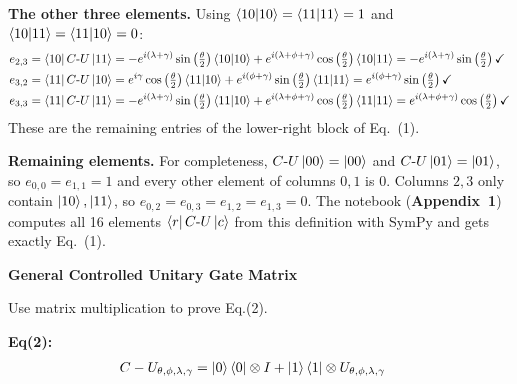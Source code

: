\documentclass[a4paper, 10pt]{article}
\begin{document}
\begin{solution}
	\noindent \textbf{The other three elements.} Using \( \braket{10 \vert 10} = \braket{11 \vert 11} = 1 \) and \( \braket{10 \vert 11} = \braket{11 \vert 10} = 0 \):
	\begin{align*}
		e_{2, 3} & = \bra{10} C\text{-}U \ket{11} = -e^{i\left(\lambda + \gamma\right)}\sin\left(\tfrac{\theta}{2}\right)\braket{10 \vert 10} + e^{i\left(\lambda + \phi + \gamma\right)}\cos\left(\tfrac{\theta}{2}\right)\braket{10 \vert 11} = -e^{i\left(\lambda + \gamma\right)}\sin\left(\tfrac{\theta}{2}\right) \checkmark \\
		e_{3, 2} & = \bra{11} C\text{-}U \ket{10} = e^{i\gamma}\cos\left(\tfrac{\theta}{2}\right)\braket{11 \vert 10} + e^{i\left(\phi + \gamma\right)}\sin\left(\tfrac{\theta}{2}\right)\braket{11 \vert 11} = e^{i\left(\phi + \gamma\right)}\sin\left(\tfrac{\theta}{2}\right) \checkmark \\
		e_{3, 3} & = \bra{11} C\text{-}U \ket{11} = -e^{i\left(\lambda + \gamma\right)}\sin\left(\tfrac{\theta}{2}\right)\braket{11 \vert 10} + e^{i\left(\lambda + \phi + \gamma\right)}\cos\left(\tfrac{\theta}{2}\right)\braket{11 \vert 11} = e^{i\left(\lambda + \phi + \gamma\right)}\cos\left(\tfrac{\theta}{2}\right) \checkmark
	\end{align*}
	These are the remaining entries of the lower-right block of Eq.~(1).

	\myspace

	\noindent \textbf{Remaining elements.} For completeness, \( C\text{-}U\ket{00} = \ket{00} \) and \( C\text{-}U\ket{01} = \ket{01} \), so \( e_{0, 0} = e_{1, 1} = 1 \) and every other element of columns \( 0, 1 \) is \( 0 \). Columns \( 2, 3 \) only contain \( \ket{10}, \ket{11} \), so \( e_{0, 2} = e_{0, 3} = e_{1, 2} = e_{1, 3} = 0 \).
	The notebook (\textbf{Appendix~1}) computes all 16 elements \( \bra{r} C\text{-}U \ket{c} \) from this definition with SymPy and gets exactly Eq.~(1).
\end{solution}

\begin{problem}
\textbf{General Controlled Unitary Gate Matrix}
\par Use matrix multiplication to prove Eq.(2).

\noindent \textbf{Eq(2):}
\begin{align}
	C - U_{\theta, \phi, \lambda, \gamma} & = \ket{0}\bra{0} \otimes I + \ket{1}\bra{1} \otimes U_{\theta, \phi, \lambda, \gamma}
\end{align}
\end{problem}
\end{document}

